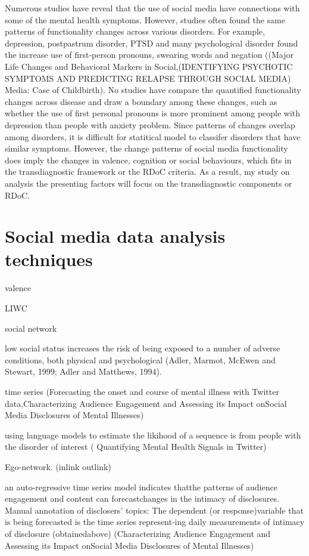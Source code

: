 Numerous studies have reveal that the use of social media have connections with some of the mental health symptoms. However, studies often found the same patterns of functionality changes across various disorders. For example, depression, postpastrum disorder, PTSD and many psychological disorder found the increase use of first-person pronouns, swearing words and negation ((Major Life Changes and Behavioral Markers in Social,(IDENTIFYING PSYCHOTIC SYMPTOMS AND PREDICTING RELAPSE THROUGH SOCIAL MEDIA) Media: Case of Childbirth). No studies have compare the quantified functionality changes across disease and draw a boundary among these changes, such as whether the use of first personal pronouns is more prominent among people with depression than people with anxiety problem. Since patterns of changes overlap among disorders, it is difficult for statitical model to classifer disorders that have similar symptoms. However, the change patterns of social media functionality does imply the changes in valence, cognition or social behaviours, which fits in the transdiagnostic framework or the RDoC criteria. As a result, my study on analysis the presenting factors will focus on the transdiagnostic components or RDoC.


\section{Social media data analysis techniques}

valence

LIWC

social network

low social status increases the risk of being exposed to a number of adverse conditions, both physical and psychological (Adler, Marmot, McEwen and Stewart, 1999; Adler and Matthews, 1994). 

time series (Forecasting the onset and course of mental illness with Twitter data,Characterizing Audience Engagement and Assessing its Impact onSocial Media Disclosures of Mental Illnesses)

 using language models to estimate the likihood of a sequence is from people with the disorder of interest ( Quantifying Mental Health Signals in Twitter)

 Ego-network. (inlink outlink)

 an auto-regressive time series model indicates thatthe patterns of audience engagement and content can forecastchanges in the intimacy of disclosures. 
Manual annotation of disclosers’ topics:
The dependent (or response)variable that is being forecasted is the time series represent-ing daily measurements of intimacy of disclosure (obtainedabove) (Characterizing Audience Engagement and Assessing its Impact onSocial Media Disclosures of Mental Illnesses)




